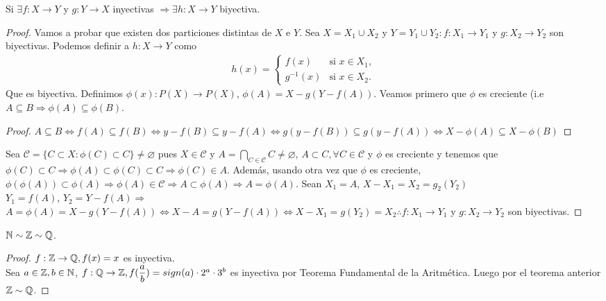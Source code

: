 \begin{theorem}
    Si $\exists f: X \to Y$ y $g: Y \to X$ inyectivas $\Rightarrow \exists h:X \to Y$ biyectiva.

    \begin{proof}
        Vamos a probar que existen dos particiones distintas de $X$ e $Y$. Sea $X = X_1 \cup X_2$ y $Y = Y_1 \cup Y_2 : f: X_1 \to Y_1$ y $g: X_2 \to Y_2$ son biyectivas. Podemos definir a $h: X \to Y$ como \begin{align*} h(x) = \begin{cases}
                       f(x)      & \text{si } x \in X_1, \\
                       g^{-1}(x) & \text{si } x \in X_2.
                   \end{cases}
        \end{align*}
        Que es biyectiva. Definimos $\phi(x):P(X) \to P(X)$, $\phi(A) = X-g(Y-f(A))$. Veamos primero que $\phi$ es creciente (i.e $A \subseteq B \Rightarrow \phi(A) \subseteq \phi(B)$.
        \begin{proof}
            $A \subseteq B \iff f(A) \subseteq f(B) \iff y - f(B) \subseteq y - f(A) \iff g(y-f(B)) \subseteq g(y-f(A)) \iff X - \phi(A) \subseteq X - \phi(B)$
        \end{proof}

        Sea $\mathscr{C} = \{ C \subset X: \phi(C) \subset C \} \neq \varnothing$ pues $X \in \mathscr{C}$ y $A = \bigcap_{C \in \mathscr{C}} C \neq \varnothing$, $A \subset C, \forall C \in \mathscr{C}$ y $\phi$ es creciente y tenemos que $\phi(C) \subset C \Rightarrow \phi(A) \subset \phi(C) \subset C \Rightarrow \phi(C) \in A$. Además, usando otra vez que $\phi$ es creciente, $\phi(\phi(A)) \subset \phi(A) \Rightarrow \phi(A) \in \mathscr{C} \Rightarrow A \subset \phi(A) \Rightarrow A = \phi(A)$.
        Sean $X_1 = A$, $X-X_1=X_2=g_2(Y_2)$ \\
        $Y_1 = f(A)$, $Y_2 = Y - f(A) \Rightarrow$ \\
        $A = \phi(A) = X-g(Y-f(A)) \iff X-A = g(Y-f(A)) \iff X-X_1=g(Y_2) = X_2 \therefore f:X_1 \to Y_1$ y $g: X_2 \to Y_2$ son biyectivas.
    \end{proof}
\end{theorem}

\clearpage

\begin{eg}
    $\mathbb{N} \sim \mathbb{Z} \sim \mathbb{Q}$.
    \begin{proof}
        $f:\mathbb{Z} \to \mathbb{Q}, f(x) = x$ es inyectiva. \\
        Sea $a \in \mathbb{Z}, b \in \mathbb{N}$, $f: \mathbb{Q} \to \mathbb{Z}, f(\dfrac{a}{b})=sign(a) \cdot 2^a \cdot 3^b$ es inyectiva por Teorema Fundamental de la Aritmética. Luego por el teorema anterior $\mathbb{Z} \sim \mathbb{Q}$.
    \end{proof}
\end{eg}

